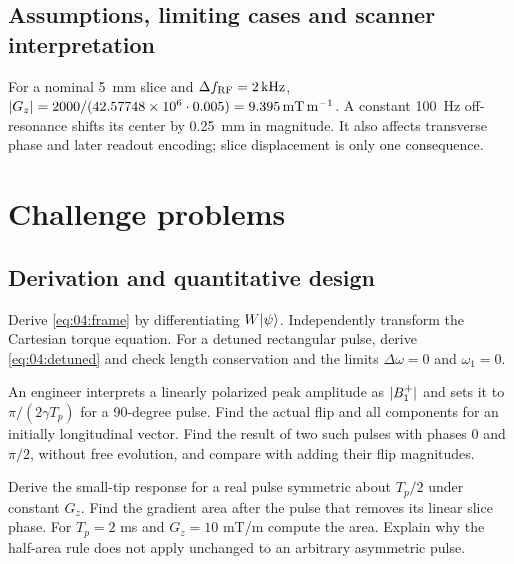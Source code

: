 \subsection{Assumptions, limiting cases and scanner interpretation}
\begin{workedexample}
For a nominal \SI{5}{\milli\metre} slice and
$\Delta f_{\rm RF}=\SI{2}{\kilo\hertz}$,
$\lvert G_z\rvert=2000/(42.57748\times10^6\cdot0.005)
=\SI{9.395}{\milli\tesla\per\metre}$.
A constant \SI{100}{\hertz} off-resonance shifts its center by
\SI{0.25}{\milli\metre} in magnitude. It also affects transverse phase
and later readout encoding; slice displacement is only one consequence.
\end{workedexample}

\section{Challenge problems}
\label{sec:04:challenge-problems}
\subsection{Derivation and quantitative design}
\begin{challengeproblem}
\label{prob:04:frame}
Derive \cref{eq:04:frame} by differentiating $W\lvert \psi\rangle$.
Independently transform the Cartesian torque equation.
For a detuned rectangular pulse, derive \cref{eq:04:detuned} and
check length conservation and the limits $\Delta\omega=0$ and
$\omega_1=0$.
\end{challengeproblem}
\begin{challengeproblem}
\label{prob:04:factor}
An engineer interprets a linearly polarized peak amplitude as $\lvert B_{1}^{+}\rvert$
and sets it to $\pi/(2\gamma T_p)$ for a 90-degree pulse.
Find the actual flip and all components for an initially longitudinal
vector. Find the result of two such pulses with phases $0$ and $\pi/2$,
without free evolution, and compare with adding their flip magnitudes.
\end{challengeproblem}
\begin{challengeproblem}
\label{prob:04:select}
Derive the small-tip response for a real pulse symmetric about $T_p/2$
under constant $G_z$. Find the gradient area after the pulse that
removes its linear slice phase. For $T_p=2$ ms and
$G_z=10$ mT/m compute the area. Explain why the half-area rule does not
apply unchanged to an arbitrary asymmetric pulse.
\end{challengeproblem}
